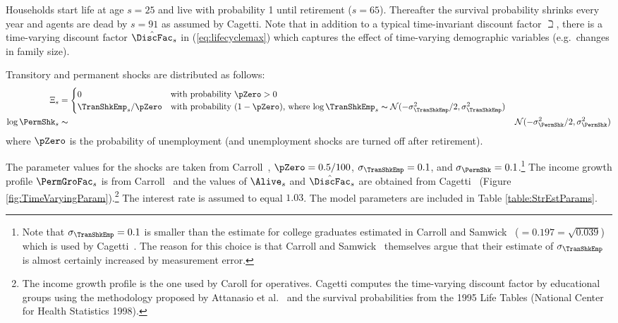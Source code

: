 \documentclass[titlepage, headings=optiontotocandhead]{\econtex}
\begin{document}
Households start life at age $s=25$ and live with probability 1 until retirement
($s=65$). Thereafter the survival probability shrinks every year and
agents are dead by $s=91$ as assumed by Cagetti. Note that in addition to a typical
time-invariant discount factor $\beth$, there is a time-varying
discount factor $\hat{\DiscFac}_{s}$ in (\ref{eq:lifecyclemax}) which
captures the effect of time-varying demographic variables (e.g.\ changes in family size).

Transitory and permanent shocks are distributed as follows:
\begin{equation}\begin{gathered}\begin{aligned}
      \Xi_{s} & = 
      \begin{cases}
        0\phantom{/\pZero} & \text{with probability $\pZero>0$} \\
        \TranShkEmp_{s}/\pZero      & \text{with probability $(1-\pZero)$, where $\log \TranShkEmp_{s}\thicksim \mathcal{N}(-\sigma_{\TranShkEmp}^{2}/2,\sigma_{\TranShkEmp}^{2})$}\\
      \end{cases}\\
      \log \PermShk_{s} &\thicksim& \mathcal{N}(-\sigma_{\PermShk}^{2}/2,\sigma_{\PermShk}^{2})
    \end{aligned}\end{gathered}\end{equation}
where $\pZero$ is the probability of unemployment (and unemployment shocks are turned off after retirement).

The parameter values for the shocks are taken from Carroll~\citeyearpar{carroll:brookings}, $\pZero=0.5/100$, $\sigma _{\TranShkEmp }=0.1$, and $\sigma_{\PermShk}=0.1$.\footnote{Note that $\sigma _{\TranShkEmp}=0.1$ is smaller than the estimate for college graduates estimated in
  Carroll and Samwick~\citeyearpar{carroll&samwick:nature} ($=0.197=\sqrt{0.039}$) which is used by Cagetti~\citeyearpar{cagettiWprofiles}. The reason for this choice is that Carroll and Samwick~\citeyearpar{carroll&samwick:nature} themselves argue that their estimate of $\sigma_{\TranShkEmp }$ is almost certainly increased by measurement error.} The income growth profile $\PermGroFac_{s}$ is from Carroll~\citeyearpar{carrollBSLCPIH} and the values of $\Alive_{s}$ and $\hat{\DiscFac}_{s}$ are obtained from Cagetti~\citeyearpar{cagettiWprofiles} (Figure \ref{fig:TimeVaryingParam}).\footnote{The income growth profile is the one used by Caroll for operatives. Cagetti computes the time-varying discount factor by educational groups using the methodology proposed by Attanasio et al.~\citeyearpar{AttanasioBanksMeghirWeber} and the survival probabilities from the 1995 Life Tables (National Center for Health Statistics 1998).} The interest rate is assumed to equal $1.03$. The model parameters are included in Table \ref{table:StrEstParams}.
\end{document}
